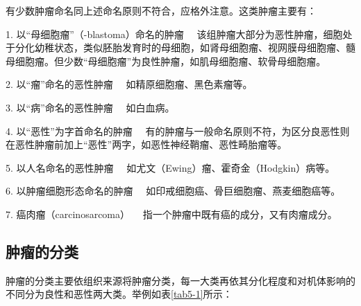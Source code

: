 有少数肿瘤命名同上述命名原则不符合，应格外注意。这类肿瘤主要有：

{1. 以“母细胞瘤”（-blastoma）命名的肿瘤}
　该组肿瘤大部分为恶性肿瘤，细胞处于分化幼稚状态，类似胚胎发育时的母细胞，如肾母细胞瘤、视网膜母细胞瘤、髓母细胞瘤。但少数“母细胞瘤”为良性肿瘤，如肌母细胞瘤、软骨母细胞瘤。

{2. 以“瘤”命名的恶性肿瘤} 　如精原细胞瘤、黑色素瘤等。

{3. 以“病”命名的恶性肿瘤} 　如白血病。

{4. 以“恶性”为字首命名的肿瘤}
　有的肿瘤与一般命名原则不符，为区分良恶性则在恶性肿瘤前加上“恶性”两字，如恶性神经鞘瘤、恶性畸胎瘤等。

{5. 以人名命名的恶性肿瘤} 　如尤文（Ewing）瘤、霍奇金（Hodgkin）病等。

{6. 以肿瘤细胞形态命名的肿瘤} 　如印戒细胞癌、骨巨细胞瘤、燕麦细胞癌等。

{7. 癌肉瘤（carcinosarcoma）} 　指一个肿瘤中既有癌的成分，又有肉瘤成分。

\subsection{肿瘤的分类}

肿瘤的分类主要依组织来源将肿瘤分类，每一大类再依其分化程度和对机体影响的不同分为良性和恶性两大类。举例如表\ref{tab5-1}所示：

